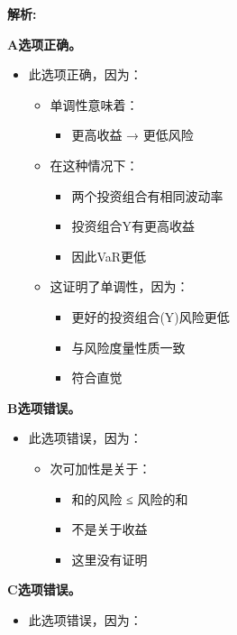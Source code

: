 \documentclass{article}
\newenvironment{explanation}
{\textbf{解析:}\par}
{\par}
\begin{document}
\begin{explanation}
    \textbf{A选项正确。}
    \begin{itemize}
        \item 此选项正确，因为：
        \begin{itemize}
            \item 单调性意味着：
            \begin{itemize}
                \item 更高收益 → 更低风险
            \end{itemize}
            \item 在这种情况下：
            \begin{itemize}
                \item 两个投资组合有相同波动率
                \item 投资组合Y有更高收益
                \item 因此VaR更低
            \end{itemize}
            \item 这证明了单调性，因为：
            \begin{itemize}
                \item 更好的投资组合(Y)风险更低
                \item 与风险度量性质一致
                \item 符合直觉
            \end{itemize}
        \end{itemize}
    \end{itemize}
    \textbf{B选项错误。}
    \begin{itemize}
        \item 此选项错误，因为：
        \begin{itemize}
            \item 次可加性是关于：
            \begin{itemize}
                \item 和的风险 ≤ 风险的和
                \item 不是关于收益
                \item 这里没有证明
            \end{itemize}
        \end{itemize}
    \end{itemize}
    \textbf{C选项错误。}
    \begin{itemize}
        \item 此选项错误，因为：
        \begin{itemize}

\end{itemize}
\end{itemize}
\end{explanation}
\end{document}
